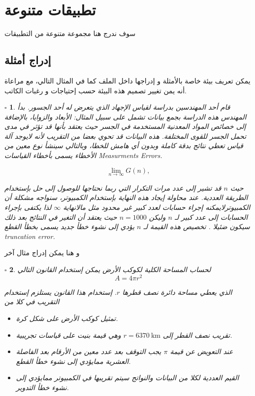 \documentclass[a4 paper]{report}
\theoremstyle{mystyle}
\newtheorem{example}{$\square$ \arabicfonttt{\underline{مثال}}}[chapter]
\theoremstyle{Excercises}
\newcommand{\eng}{\textenglish}  %
\begin{document}
\section{تطبيقات متنوعة}
سوف ندرج هنا مجموعة متنوعة من التطبيقات

\subsection{إدراج أمثلة}
يمكن تعريف بيئة خاصة بالأمثلة و إدراجها داخل الملف كما في المثال التالي، مع مراعاة أنه يمن تغيير تصميم هذه البيئة حسب إحتياجات و رغبات الكاتب.
\begin{example}
قام أحد المهندسين بدراسة لقياس الإجهاد الذي يتعرض له أحد الجسور. بدأ المهندس هذه الدراسة بجمع بيانات تشمل
على سبيل المثال: الأبعاد والزوايا، بالإضافة إلى خصائص المواد المعدنية المستخدمة في الجسر حيث يعتقد بأنها قد تؤثر في مدى تحمل الجسر للقوى المختلفة. هذه البيانات قد تحوي بعضا من التقريب لأنه لايوجد آلة قياس تعطي نتائج  بدقة كاملة وبدون أي هامش للخطا، وبالتالي سينشأ نوع معين من الأخطاء يسمى بأخطاء القياسات  \eng{Measurments Errors}.

\begin{equation}\label{eqn1}
  \lim_{n\rightarrow\infty} G(n),
\end{equation}

حيث $n$ قد تشير إلى عدد مرات التكرار التي ربما نحتاجها للوصول إلى حل بإستخدام الطريقة العددية. عند محاولة إيجاد هذه النهاية بإستخدام الكمبيوتر، سنواجه مشكلة أن الكمبيوترلايمكنه إجراء حسابات لعدد كبير غير محدود مثل مالانهاية $\infty$ لذا يكتفى بإجراء الحسابات إلى عدد كبير لـ $n$  وليكن $n = 1000$  حيث يعتقد أن التغير في النتائج بعد ذلك سيكون ضئيلا
\cite{Attaway}. تخصيص هذه القيمة لـ $n$  يؤدي إلى نشوء خطأ جديد يسمى بخطأ القطع \eng{truncation error}.
\end{example}
و هنا يمكن إدراج مثال آخر

\begin{example}
لحساب المساحة الكلية لكوكب الأرض يمكن إستخدام القانون التالي
\begin{equation}\label{eqn2}
 A = 4 \pi r^2
\end{equation}

الذي يعطي مساحة دائرة نصف قطرها  $r$. إستخدام هذا القانون يستلزم إستخدام التقريب في كلا من
\begin{itemize}
\item تمثيل كوكب الأرض على شكل كرة.
\item تقريب نصف القطر  إلى $ r = 6370 \:\text{km}$ وهي قيمة بنيت على قياسات تجريبية.
\item عند التعويض عن قيمة $\pi$ يجب التوقف بعد عدد معين من الأرقام بعد الفاصلة العشرية ممايؤدي إلى نشوء خطأ القطع.
\item القيم العددية لكلا من البيانات والنواتج سيتم تقريبها في الكمبيوتر ممايؤدي إلى نشوء خطأ التدوير.
\end{itemize}
\end{example}
\end{document}
